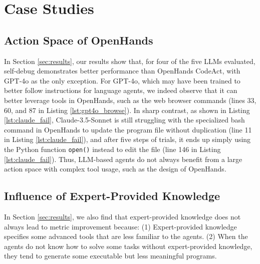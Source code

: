 \newpage
\setcounter{table}{0}
\renewcommand\thetable{\Alph{section}.\arabic{table}}
\setcounter{figure}{0}
\renewcommand\thefigure{\Alph{section}.\arabic{figure}}
\setcounter{lstlisting}{0}
\renewcommand\thelstlisting{\Alph{section}.\arabic{lstlisting}}

\section{Case Studies}
\label{app:case_studies}

\subsection{Action Space of OpenHands}
\label{app:case_1}
In Section \ref{sec:results}, our results show that, for four of the five LLMs evaluated, self-debug demonstrates better performance than OpenHands CodeAct, with GPT-4o as the only exception.
For GPT-4o, which may have been trained to better follow instructions for language agents, we indeed observe that it can better leverage tools in OpenHands, such as the web browser commands (lines 33, 60, and 87 in Listing \ref{lst:gpt4o_browse}).
In sharp contrast, as shown in Listing \ref{lst:claude_fail}, Claude-3.5-Sonnet is still struggling with the specialized bash command in OpenHands to update the program file without duplication (line 11 in Listing \ref{lst:claude_fail}), and after five steps of trials, it ends up simply using the Python function \texttt{open()} instead to edit the file (line 146 in Listing \ref{lst:claude_fail}).
Thus, LLM-based agents do not always benefit from a large action space with complex tool usage, such as the design of OpenHands.



\newpage
\subsection{Influence of Expert-Provided Knowledge}
\label{app:case_2}

In Section \ref{sec:results}, we also find that expert-provided knowledge does not always lead to metric improvement because: 
(1) Expert-provided knowledge specifies some advanced tools
that are less familiar to the agents. 
(2) When the agents do not know how to solve some tasks without expert-provided knowledge, they tend to generate some executable but less meaningful programs.

